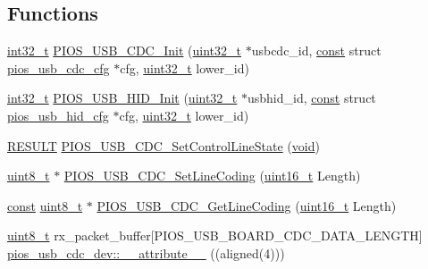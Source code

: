 \subsection*{Functions}
\begin{DoxyCompactItemize}
\item 
\hyperlink{group___n_a_m_e_gafd12020da5a235dfcf0c3c748fb5baed}{int32\-\_\-t} \hyperlink{group___p_i_o_s___u_s_b___c_o_m_ga30299ce46992751181aeb3d997b75ca8}{P\-I\-O\-S\-\_\-\-U\-S\-B\-\_\-\-C\-D\-C\-\_\-\-Init} (\hyperlink{stdint_8h_a435d1572bf3f880d55459d9805097f62}{uint32\-\_\-t} $\ast$usbcdc\-\_\-id, \hyperlink{group___n_a_m_e_ga7ae6d0e43244213b34de2c2b9aa30da6}{const} struct \hyperlink{structpios__usb__cdc__cfg}{pios\-\_\-usb\-\_\-cdc\-\_\-cfg} $\ast$cfg, \hyperlink{stdint_8h_a435d1572bf3f880d55459d9805097f62}{uint32\-\_\-t} lower\-\_\-id)
\item 
\hyperlink{group___n_a_m_e_gafd12020da5a235dfcf0c3c748fb5baed}{int32\-\_\-t} \hyperlink{group___p_i_o_s___u_s_b___c_o_m_ga4ea302beb0afbb7a83ff9ff1b20eb9cc}{P\-I\-O\-S\-\_\-\-U\-S\-B\-\_\-\-H\-I\-D\-\_\-\-Init} (\hyperlink{stdint_8h_a435d1572bf3f880d55459d9805097f62}{uint32\-\_\-t} $\ast$usbhid\-\_\-id, \hyperlink{group___n_a_m_e_ga7ae6d0e43244213b34de2c2b9aa30da6}{const} struct \hyperlink{structpios__usb__hid__cfg}{pios\-\_\-usb\-\_\-hid\-\_\-cfg} $\ast$cfg, \hyperlink{stdint_8h_a435d1572bf3f880d55459d9805097f62}{uint32\-\_\-t} lower\-\_\-id)
\item 
\hyperlink{_s_t_m32_f10x_2_libraries_2_s_t_m32___u_s_b-_f_s-_device___driver_2inc_2usb__core_8h_ac0c5cc7751807fb0264baeab942bc8c3}{R\-E\-S\-U\-L\-T} \hyperlink{group___p_i_o_s___u_s_b___c_o_m_gacbf6b3b4149e51a74c2f4255f0f8a199}{P\-I\-O\-S\-\_\-\-U\-S\-B\-\_\-\-C\-D\-C\-\_\-\-Set\-Control\-Line\-State} (\hyperlink{group___n_a_m_e_ga18028b8badbf1ea7e704ccac3c488e82}{void})
\item 
\hyperlink{stdint_8h_aba7bc1797add20fe3efdf37ced1182c5}{uint8\-\_\-t} $\ast$ \hyperlink{group___p_i_o_s___u_s_b___c_o_m_ga120d6d9cf08ed1125a62ea6759047914}{P\-I\-O\-S\-\_\-\-U\-S\-B\-\_\-\-C\-D\-C\-\_\-\-Set\-Line\-Coding} (\hyperlink{stdint_8h_a273cf69d639a59973b6019625df33e30}{uint16\-\_\-t} Length)
\item 
\hyperlink{group___n_a_m_e_ga7ae6d0e43244213b34de2c2b9aa30da6}{const} \hyperlink{stdint_8h_aba7bc1797add20fe3efdf37ced1182c5}{uint8\-\_\-t} $\ast$ \hyperlink{group___p_i_o_s___u_s_b___c_o_m_ga41d64940656273048e2558acb7609dc4}{P\-I\-O\-S\-\_\-\-U\-S\-B\-\_\-\-C\-D\-C\-\_\-\-Get\-Line\-Coding} (\hyperlink{stdint_8h_a273cf69d639a59973b6019625df33e30}{uint16\-\_\-t} Length)
\item 
\hyperlink{stdint_8h_aba7bc1797add20fe3efdf37ced1182c5}{uint8\-\_\-t} rx\-\_\-packet\-\_\-buffer\mbox{[}P\-I\-O\-S\-\_\-\-U\-S\-B\-\_\-\-B\-O\-A\-R\-D\-\_\-\-C\-D\-C\-\_\-\-D\-A\-T\-A\-\_\-\-L\-E\-N\-G\-T\-H\mbox{]} \hyperlink{group___p_i_o_s___u_s_b___c_o_m_gab58a69ef6ffba4b36cf99ba5dfd9798c}{pios\-\_\-usb\-\_\-cdc\-\_\-dev\-::\-\_\-\-\_\-attribute\-\_\-\-\_\-} ((aligned(4)))
\end{DoxyCompactItemize}
